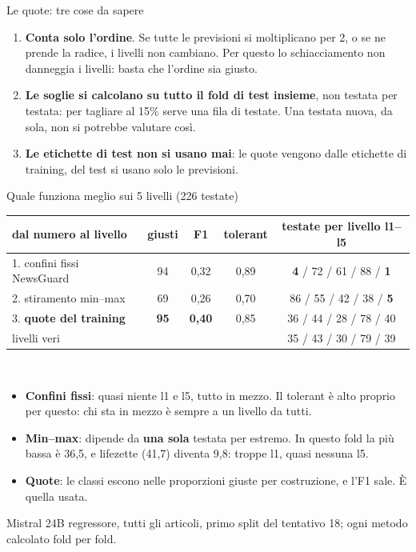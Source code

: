 \documentclass[aspectratio=169]{beamer}
\newcommand{\hl}[1]{\textbf{#1}}
\newcommand{\errore}[1]{\textcolor{rosso}{\textbf{#1}}}
\begin{document}
\begin{frame}{Le quote: tre cose da sapere}
  \vfill
  \begin{enumerate}
    \setlength\itemsep{1em}
    \item \hl{Conta solo l'ordine}. Se tutte le previsioni si moltiplicano per 2, o se ne prende la radice, i livelli non
          cambiano. Per questo lo schiacciamento non danneggia i livelli: basta che l'ordine sia giusto.
    \item \hl{Le soglie si calcolano su tutto il fold di test insieme}, non testata per testata: per tagliare al 15\% serve una
          fila di testate. Una testata nuova, da sola, non si potrebbe valutare cos\`i.
    \item \hl{Le etichette di test non si usano mai}: le quote vengono dalle etichette di training, del test si usano solo le
          previsioni.
  \end{enumerate}
  \vfill
\end{frame}

\begin{frame}{Quale funziona meglio sui 5 livelli (226 testate)}
  \centering\small
  \begin{tabular}{lcccc}
    \toprule
    \textbf{dal numero al livello} & \textbf{giusti} & \textbf{F1} & \textbf{tolerant} & \textbf{testate per livello l1--l5} \\
    \midrule
    1. confini fissi NewsGuard & 94 & 0,32 & 0,89 & \errore{4} / 72 / 61 / 88 / \errore{1} \\
    2. stiramento min--max & 69 & 0,26 & 0,70 & 86 / 55 / 42 / 38 / \errore{5} \\
    3. \hl{quote del training} & \textbf{95} & \textbf{0,40} & 0,85 & 36 / 44 / 28 / 78 / 40 \\
    \midrule
    livelli veri & & & & 35 / 43 / 30 / 79 / 39 \\
    \bottomrule
  \end{tabular}\\[1em]
  \raggedright
  \begin{itemize}
    \setlength\itemsep{0.4em}
    \item \hl{Confini fissi}: quasi niente l1 e l5, tutto in mezzo. Il tolerant \`e alto proprio per questo: chi sta in mezzo \`e
          sempre a un livello da tutti.
    \item \hl{Min--max}: dipende da \hl{una sola} testata per estremo. In questo fold la pi\`u bassa \`e 36,5, e lifezette
          (41,7) diventa 9,8: troppe l1, quasi nessuna l5.
    \item \hl{Quote}: le classi escono nelle proporzioni giuste per costruzione, e l'F1 sale. \`E quella usata.
  \end{itemize}
  {\scriptsize Mistral 24B regressore, tutti gli articoli, primo split del tentativo 18; ogni metodo calcolato fold per fold.}
\end{frame}
\end{document}
